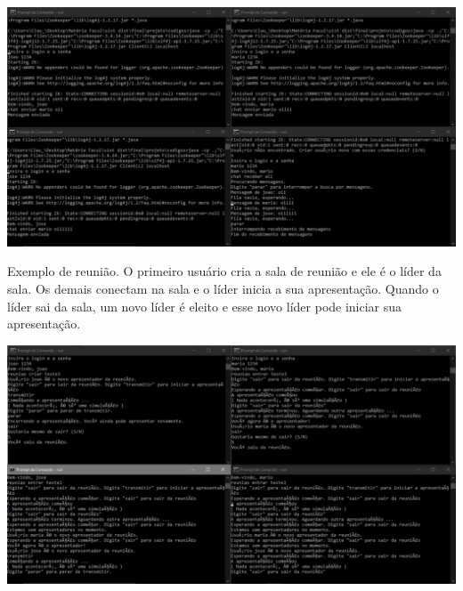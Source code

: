 \begin{center}
\includegraphics[width=20cm]{projeto/prints/exemplo-chat1.jpeg}
\end{center}

\par Exemplo de reunião. O primeiro usuário cria a sala de reunião e ele é o líder da sala. Os demais conectam na sala e o líder inicia a sua apresentação. Quando o líder sai da sala, um novo líder é eleito e esse novo líder pode iniciar sua apresentação.

\begin{center}
\includegraphics[width=20cm]{projeto/prints/exemplo-reuniao1.jpeg}
\end{center}
